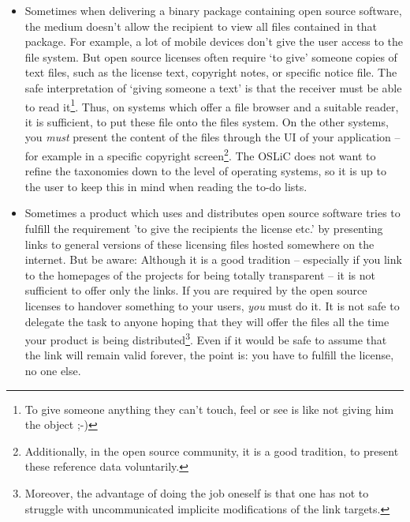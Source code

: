 \label{DistributingFilesHint}
\begin{itemize}
  \item
  Sometimes when delivering a binary package containing open source software,
  the medium doesn’t allow the recipient to view all files contained in that
  package. For example, a lot of mobile devices don’t give the user access to
  the file system. But open source licenses often require ‘to give’ someone
  copies of text files, such as the license text, copyright notes, or specific
  notice file. The safe interpretation of ‘giving someone a text’ is that the
  receiver must be able to read it\footnote{To give someone anything they can't
  touch, feel or see is like not giving him the object ;-)}. Thus, on
  systems which offer a file browser and a suitable reader, it is sufficient, to
  put these file onto the files system. On the other systems, you \emph{must}
  present the content of the files  through the UI of your application -- for
  example in a specific copyright screen\footnote{Additionally, in the open
  source community, it is a good tradition, to present these reference data
  voluntarily.}. The OSLiC does not want to refine the taxonomies down to the
  level of operating systems, so it is up to the user to keep this in mind when
  reading the to-do lists.
  
  \item Sometimes a product which uses and distributes open source software
  tries to fulfill the requirement 'to give the recipients the license etc.' by
  presenting links to general versions of these licensing files hosted somewhere
  on the internet. But be aware: Although it is a good tradition -- especially
  if you link to the homepages of the projects for being totally transparent --
  it is not sufficient to offer only the links. If you are required by the open
  source licenses to handover something to your users, \emph{you} must do it. It
  is not safe to delegate the task to anyone hoping that they will offer the
  files all the time your product is being distributed\footnote{Moreover, the
  advantage of doing the job oneself is that one has not to struggle with
  uncommunicated implicite modifications of the link targets.}. Even if it would
  be safe to assume that the link will remain valid forever, the point is: you
  have to fulfill the license, no one else.
\end{itemize}

\label{OSUCToDoLists}
